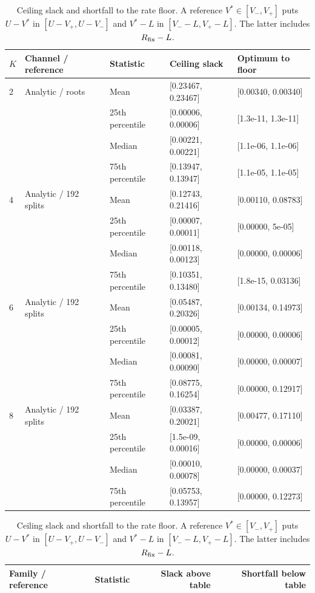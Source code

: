 \documentclass[10pt,letterpaper]{article}
\begin{document}
\begin{table}[htbp]\centering\small
\setlength{\tabcolsep}{4pt}
\caption{Ceiling slack and shortfall to the rate floor. A reference $V^*\in[V_-,V_+]$ puts $U-V^*$ in $[U-V_+,U-V_-]$ and $V^*-L$ in $[V_--L,V_+-L]$. The latter includes $R_{\rm fix}-L$.}\label{supp:decomposition}
\begin{tabular}{lllll}\toprule
$K$ & Channel / reference & Statistic & Ceiling slack & Optimum to floor\\
\midrule
2 & Analytic / roots & Mean & [0.23467, 0.23467] & [0.00340, 0.00340]\\
 &  & 25th percentile & [0.00006, 0.00006] & [1.3e-11, 1.3e-11]\\
 &  & Median & [0.00221, 0.00221] & [1.1e-06, 1.1e-06]\\
 &  & 75th percentile & [0.13947, 0.13947] & [1.1e-05, 1.1e-05]\\
4 & Analytic / 192 splits & Mean & [0.12743, 0.21416] & [0.00110, 0.08783]\\
 &  & 25th percentile & [0.00007, 0.00011] & [0.00000, 5e-05]\\
 &  & Median & [0.00118, 0.00123] & [0.00000, 0.00006]\\
 &  & 75th percentile & [0.10351, 0.13480] & [1.8e-15, 0.03136]\\
6 & Analytic / 192 splits & Mean & [0.05487, 0.20326] & [0.00134, 0.14973]\\
 &  & 25th percentile & [0.00005, 0.00012] & [0.00000, 0.00006]\\
 &  & Median & [0.00081, 0.00090] & [0.00000, 0.00007]\\
 &  & 75th percentile & [0.08775, 0.16254] & [0.00000, 0.12917]\\
8 & Analytic / 192 splits & Mean & [0.03387, 0.20021] & [0.00477, 0.17110]\\
 &  & 25th percentile & [1.5e-09, 0.00016] & [0.00000, 0.00006]\\
 &  & Median & [0.00010, 0.00078] & [0.00000, 0.00037]\\
 &  & 75th percentile & [0.05753, 0.13957] & [0.00000, 0.12273]\\
\bottomrule\end{tabular}
\par\medskip\begin{minipage}{\linewidth}\small
\par\smallskip\noindent\begin{tabular}{llrr}\toprule Family / reference & Statistic & Slack above table & Shortfall below table\\\midrule

\end{tabular}
\end{minipage}
\end{table}
\end{document}

